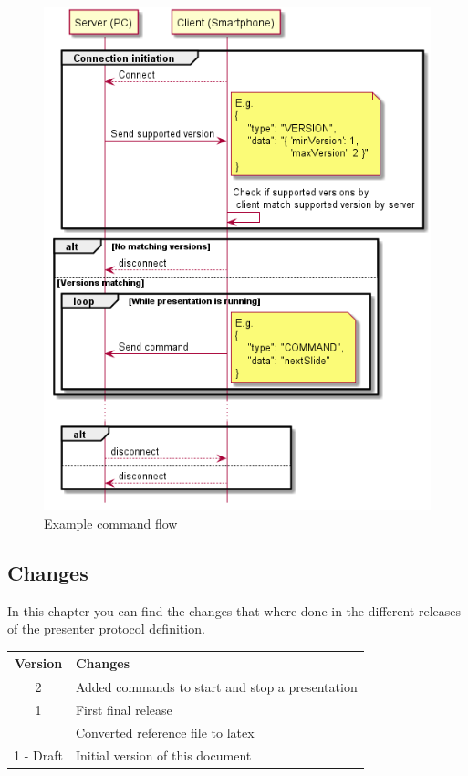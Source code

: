 \documentclass{article}
\begin{document}
\begin{figure}
\centering
\includegraphics{./diagrams/gen/CommandFlow.png}
\caption{Example command flow}
\label{command_flow}
\end{figure}

\printbibliography[heading=subbibliography]

\newpage

\subsection{Changes}

In this chapter you can find the changes that where done in the different releases of the presenter protocol definition.

\begin{longtable}{cl}
\toprule
Version & Changes\tabularnewline
\midrule
\endhead
2 & Added commands to start and stop a presentation\\
1 & First final release \\
  & Converted reference file to latex\\
1 - Draft & Initial version of this document\\
\bottomrule
\end{longtable}
\end{document}
